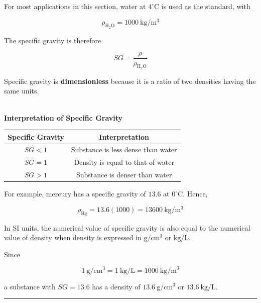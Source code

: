 \documentclass[12pt]{article}
\newcommand{\mysubsection}[2]{%
    \noindent{\headingfont\large #1\space #2\par}
    \vspace{4pt}
    \hrule
    \vspace{15pt}
}
\begin{document}
For most applications in this section, water at $4^\circ\mathrm{C}$ is used as the standard, with

\begin{equation*}
    \rho_{\mathrm{H_2O}} = 1000\ \mathrm{kg/m^3}
\end{equation*}

The specific gravity is therefore

\begin{equation*}
    SG = \frac{\rho}{\rho_{\mathrm{H_2O}}}
\end{equation*}

Specific gravity is \textbf{dimensionless} because it is a ratio of two densities having the same units.

\textbf{\\ Interpretation of Specific Gravity}

\begin{center}
    \begin{tabular}{|c|c|}
        \hline
        \textbf{Specific Gravity} & \textbf{Interpretation} \\
        \hline
        $SG < 1$ & Substance is less dense than water \\
        \hline
        $SG = 1$ & Density is equal to that of water \\
        \hline
        $SG > 1$ & Substance is denser than water \\
        \hline
    \end{tabular}
\end{center}

For example, mercury has a specific gravity of $13.6$ at $0^\circ\mathrm{C}$. Hence,

\begin{equation*}
    \rho_{\mathrm{Hg}} = 13.6(1000)
    = 13600\ \mathrm{kg/m^3}
\end{equation*}

In SI units, the numerical value of specific gravity is also equal to the numerical value of density when density is expressed in $\mathrm{g/cm^3}$ or $\mathrm{kg/L}$.

Since

\begin{equation*}
    1\ \mathrm{g/cm^3} = 1\ \mathrm{kg/L}
    = 1000\ \mathrm{kg/m^3}
\end{equation*}

a substance with $SG=13.6$ has a density of $13.6\ \mathrm{g/cm^3}$ or $13.6\ \mathrm{kg/L}$.

\mysubsection{}{Specific Weight}
\end{document}

